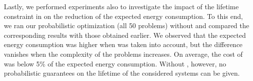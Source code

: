 Lastly, we performed experiments also to investigate the impact of the lifetime constraint in  on the reduction of the expected energy consumption.
To this end, we ran our probabilistic optimization (all 50 problems) without  and compared the corresponding results with those obtained earlier.
We observed that the expected energy consumption was higher when  was taken into account, but the difference vanishes when the complexity of the problems increases.
On average, the cost of  was below 5\% of the expected energy consumption.
Without , however, no probabilistic guarantees on the lifetime of the considered systems can be given.
